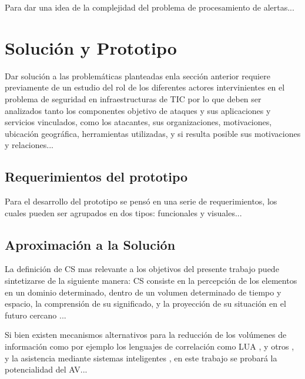 \documentclass[a4paper]{./plantillas/llncs}
\begin{document}
Para dar una idea de la complejidad del problema de procesamiento de alertas...



\section{Solución y Prototipo}

Dar solución a las problemáticas planteadas enla sección anterior requiere previamente de un estudio del rol de los diferentes actores intervinientes en el problema de seguridad en infraestructuras de TIC por lo que deben ser analizados tanto los componentes objetivo de ataques y sus aplicaciones y servicios vinculados, como los atacantes, sus organizaciones, motivaciones, ubicación geográfica, herramientas utilizadas, y si resulta posible sus motivaciones y relaciones...

\subsection{Requerimientos del prototipo}

Para el desarrollo del prototipo se pensó en una serie de requerimientos, los cuales pueden ser agrupados en dos tipos: funcionales y visuales...

\subsection{Aproximación a la Solución}

La definición de CS mas relevante a los objetivos del presente trabajo puede sintetizarse de la siguiente manera: CS consiste en la percepción de los elementos en un dominio determinado, dentro de un volumen determinado de tiempo y espacio, la comprensión de su significado, y la proyección de su situación en el futuro cercano \cite{b2}...

Si bien existen mecanismos alternativos para la reducción de los volúmenes de información como por ejemplo los lenguajes de correlación como LUA \cite{b3}, y otros \cite{b4} \cite{b5} \cite{b6}, y la asistencia mediante sistemas inteligentes \cite{b7} \cite{b8} \cite{b9} \cite{b10}, en este trabajo se probará la potencialidad del AV... 
\end{document}
